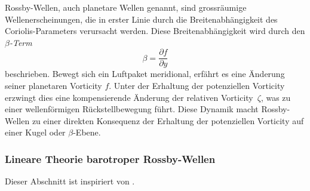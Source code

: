 
Rossby-Wellen, auch planetare Wellen genannt, sind grossräumige
Wellenerscheinungen, die in erster Linie durch die Breitenabhängigkeit des
Coriolis-Parameters verursacht werden. Diese Breitenabhängigkeit wird durch den \emph{$\beta$-Term}
%
\begin{equation}
	\beta = \frac{\partial f}{\partial y}
	\label{rossby:eq:beta_term}
\end{equation}
beschrieben. Bewegt sich ein Luftpaket meridional, erfährt es eine Änderung seiner planetaren Vorticity \(f\). Unter der Erhaltung der potenziellen Vorticity erzwingt dies eine kompensierende Änderung der relativen Vorticity~\(\zeta\), was zu einer wellenförmigen Rückstellbewegung führt.
Diese Dynamik macht Rossby-Wellen zu einer direkten Konsequenz der Erhaltung der potenziellen Vorticity auf einer Kugel oder \(\beta\)-Ebene.

\subsubsection{Lineare Theorie barotroper Rossby-Wellen}

Dieser Abschnitt ist inspiriert von \cite{rossby:mueller2018}.

